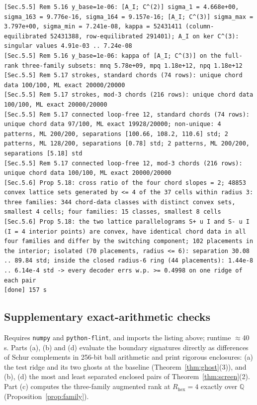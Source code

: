 \documentclass[11pt,a4paper]{article}
\theoremstyle{definition}
\theoremstyle{remark}
\begin{document}
\begin{lstlisting}[style=consolestyle]
[Sec.5.5] Rem 5.16 y_base=1e-06: [A_I; C^(2)] sigma_1 = 4.668e+00, sigma_163 = 9.776e-16, sigma_164 = 9.157e-16; [A_I; C^(3)] sigma_max = 3.797e+00, sigma_min = 7.241e-08, kappa = 52431411 (column-equilibrated 52431388, row-equilibrated 291401); A_I on ker C^(3): singular values 4.91e-03 .. 7.24e-08
[Sec.5.5] Rem 5.16 y_base=1e-06: kappa of [A_I; C^(3)] on the full-rank three-family subsets: mnq 5.78e+09, mpq 1.18e+12, npq 1.18e+12
[Sec.5.5] Rem 5.17 strokes, standard chords (74 rows): unique chord data 100/100, ML exact 20000/20000
[Sec.5.5] Rem 5.17 strokes, mod-3 chords (216 rows): unique chord data 100/100, ML exact 20000/20000
[Sec.5.5] Rem 5.17 connected loop-free 12, standard chords (74 rows): unique chord data 97/100, ML exact 19928/20000; non-unique: 4 patterns, ML 200/200, separations [100.66, 108.2, 110.6] std; 2 patterns, ML 128/200, separations [0.78] std; 2 patterns, ML 200/200, separations [5.18] std
[Sec.5.5] Rem 5.17 connected loop-free 12, mod-3 chords (216 rows): unique chord data 100/100, ML exact 20000/20000
[Sec.5.6] Prop 5.18: cross ratio of the four chord slopes = 2; 48853 convex lattice sets generated by <= 4 of the 37 cells within radius 3: three families: 344 chord-data classes with distinct convex sets, smallest 4 cells; four families: 15 classes, smallest 8 cells
[Sec.5.6] Prop 5.18: the two lattice parallelograms S+ u I and S- u I (I = 4 interior points) are convex, have identical chord data in all four families and differ by the switching component; 102 placements in the interior; isolated (70 placements, radius <= 6): separation 30.08 .. 89.84 std; inside the closed radius-6 ring (44 placements): 1.44e-8 .. 6.14e-4 std -> every decoder errs w.p. >= 0.4998 on one ridge of each pair
[done] 157 s
\end{lstlisting}

\subsection{Supplementary exact-arithmetic checks}\label{app:supp}
Requires \texttt{numpy} and \texttt{python-flint}, and imports the listing above; runtime $\approx$40 s. Parts (a), (b) and (d) evaluate the boundary signatures directly as differences of Schur complements in 256-bit ball arithmetic and print rigorous enclosures: (a) the test ridge and its two ghosts at the baseline (Theorem~\ref{thm:ghost}(3)), and (b), (d) the most and least separated enclosed pairs of Theorem~\ref{thm:screen}(2). Part (c) computes the three-family augmented rank at $R_{\text{hex}} = 4$ exactly over $\mathbb{Q}$ (Proposition~\ref{prop:family}).
\end{document}
